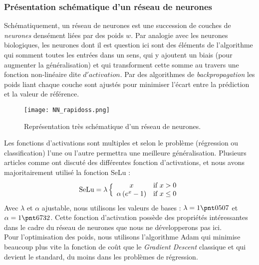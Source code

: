 \documentclass[a4paper,12pt]{article}
\newcommand{\bepar}[1]{
	\left( #1 \right)  
}
\newcommand\bk{\color{black}}
\newcommand\dsb{\color{dsb}}
\numberwithin{equation}{section} %
\begin{document}
\dsb\subsubsection{Présentation schématique d'un réseau de neurones} \bk
\noindent Schématiquement, un réseau de neurones est une succession de couches de \textit{neurones} densément liées par des poids $w$. Par analogie avec les neurones biologiques, les neurones dont il est question ici sont des éléments de l'algorithme qui somment toutes les entrées dans un sens, qui y ajoutent un biais (pour augmenter la généralisation) et qui transforment cette somme au travers une fonction non-linéaire dite $d'activation$. Par des algorithmes de \textit{backpropagation} les poids liant chaque couche sont ajustés pour minimiser l'écart entre la prédiction et la valeur de référence.
\begin{figure}[!ht]
\centering
\texttt{[image: NN\_rapidoss.png]}
\caption{\small{Représentation très schématique d'un réseau de neurones.}}
\label{NN_skeme}
\end{figure}
Les fonctions d'activations sont multiples et selon le problème (régression ou classification) l'une ou l'autre permettra une meilleure généralisation. Plusieurs articles comme \citep{krizhevsky2010convolutional} ont discuté des différentes fonction d'activations, et nous avons majoritairement utilisé la fonction SeLu \citep{klambauer2017self} :
\begin{equation}
\text{SeLu} = \lambda \,
\Big \{
		\begin{array}{c l}
		x & \text{if } x > 0 \\
		\alpha \bepar{ e^x - 1} & \text{if } x \leq 0
		\end{array}						
\end{equation}
Avec $\lambda$ et $\alpha$ ajustable, nous utilisons les valeurs de bases : $\lambda = 1\pnt 0507$ et $\alpha = 1 \pnt 6732$. Cette fonction d'activation possède des propriétés intéressantes dans le cadre du réseau de neurones que nous ne développerons pas ici.\\
Pour l'optimisation des poids, nous utilisons l'algorithme Adam \citep{kingma2014adam} qui minimise beaucoup plus vite la fonction de coût que le \textit{Gradient Descent} classique et qui devient le standard, du moins dans les problèmes de régression.
\end{document}
